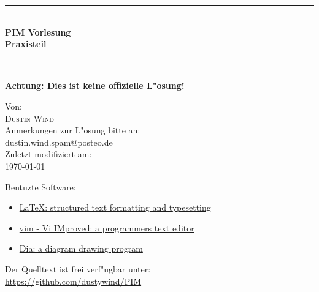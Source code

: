 

\newcommand{\TitleHRule}{\rule{\linewidth}{0.5mm}}

\begin{titlepage}
    \begin{center}

    \TitleHRule \\[0.4cm]
    { \huge \bfseries PIM Vorlesung\\Praxisteil\\[0.4cm] }
    \TitleHRule \\[1.5cm]

    \textbf{Achtung: Dies ist keine offizielle L"osung!}

    \vfill
    Von:\\
    \textsc{Dustin Wind}\\

    \vfill
    Anmerkungen zur L"osung bitte an:\\
    dustin.wind.spam@posteo.de\\


   \vfill
    Zuletzt modifiziert am:\\
    {\large \today}\\
    \end{center}
    \bigskip

    {\small
    \noindent
    Bentuzte Software:
    \begin{itemize}
        \item \href{http://www.latex-project.org}{\LaTeX{}: structured text formatting and typesetting}
        \item \href{http://www.vim.org}{vim - Vi IMproved: a programmers text editor}
        \item \href{https://wiki.gnome.org/Apps/Dia/}{Dia: a diagram drawing program}
    \end{itemize}
    \noindent
    Der Quelltext ist frei verf"ugbar unter:\\
    \url{https://github.com/dustywind/PIM}
    }

\end{titlepage}

